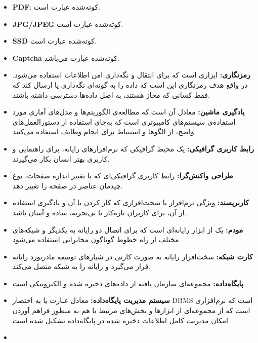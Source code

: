 \documentclass[12pt]{article}
\begin{document}
\begin{itemize}
		\item
		\textbf{PDF\label{ref:pdf}}:
		کوته‌شده عبارت
		است.
		\item
		\textbf{JPG/JPEG\label{ref:jpg}}
		کوته‌شده عبارت
		است.
		\item
		\textbf{SSD\label{ref:ssd}}
		کوته‌شده‌ عبارت
		است.
		\item
		\textbf{Captcha\label{ref:captcha}}
		کوته‌شده عبارت
		می‌باشد.
		\item
		\textbf{رمزنگاری:\label{ref:enc}}
		ابزاری است که برای انتقال و نگه‌داری امن اطلاعات استفاده می‌شود. در واقع هدف رمزنگاری این است که داده را به گونه‌ای نگه‌داری یا ارسال کند که فقط کسانی که مجاز هستند، به اصل داده‌ها دسترسی داشته باشند.
		\item
		\textbf{یادگیری ماشین:\label{ref:ml}}
		معادل آن
		است که مطالعه‌ی الگوریتم‌ها و مدل‌های آماری مورد استفاده‌ی سیستم‌های کامپیوتری است که به‌جای استفاده از دستورالعمل‌های واضح، از الگوها و استنباط برای انجام وظایف استفاده می‌کنند.
		\item
		\textbf{رابط کاربری گرافیکی:\label{ref:gui}}
		یک محیط گرافیکی که نرم‌افزارهای رایانه، برای راهنمایی و کاربری بهتر انسان بکار می‌گیرند.
		\item
		\textbf{طراحی واکنش‌گرا:‌\label{ref:responsive}}
		رابط کاربری گرافیکی‌ای که با تغییر اندازه صفحات، نوع چیدمان عناصر در صفحه را تغییر دهد.
		\item
		\textbf{کاربر‌پسند:}
		ویژگی نرم‌‏افزار یا سخت‏‌افزاری که کار کردن با آن و یادگیری استفاده از آن، برای کاربران تازه‏‌کار یا بی‌‏تجربه، ساده و آسان باشد.
		\item
		\textbf{مودم:}
		یک از ابزار رایانه‌ای است که برای اتصال دو رایانه به یکدیگر و شبکه‌های مختلف از راه خطوط گوناگون مخابراتی استفاده می‌شود.
		\item
		\textbf{کارت شبکه:‌}
		سخت‌افزار رایانه به صورت کارتی در شیارهای توسعه مادربورد رایانه قرار می‌گیرد و رایانه را به شبکه متصل می‌کند.
		\item
		\textbf{پایگاه‌داده:}
		مجموعه‌ای سازمان یافته از داده‌های ذخیره شده و الکترونیکی است.
		\item
		\textbf{سیستم مدیریت پایگاه‌داده:}
		معادل عبارت
		یا به اختصار DBMS است که نرم‌افزاری است که از مجموعه‌ای از ابزارها و بخش‌های مرتبط با هم به منظور فراهم آوردن امکان مدیریت کامل اطلاعات ذخیره شده در پایگاه‌داده تشکیل شده است.
		\item

\end{itemize}
\end{document}
